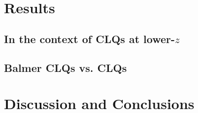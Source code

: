 \documentclass[a4paper,fleqn,usenatbib]{mnras}
\begin{document}
\section{Results}
\subsection{In the context of CLQs at lower-$z$}

\subsection{Balmer CLQs vs. \civ CLQs}


\section{Discussion and Conclusions}






\bsp	%
\label{lastpage}
\end{document}
